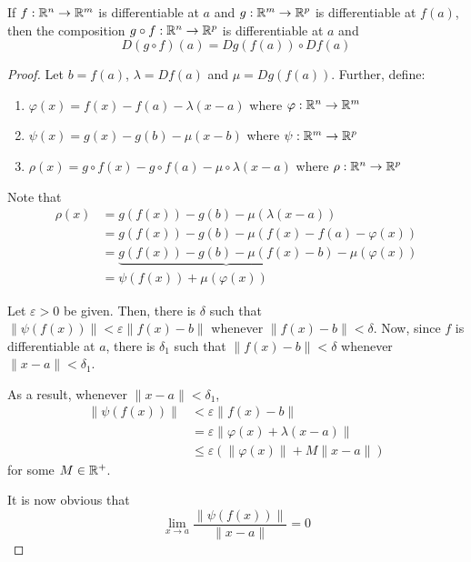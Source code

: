 \begin{theorem}
    If $f:\mathbb{R}^n\to\mathbb{R}^m$ is differentiable at $a$ and $g:\mathbb{R}^m\to\mathbb{R}^p$ is differentiable at $f(a)$, then the composition $g\circ f:\mathbb{R}^n\to\mathbb{R}^p$ is differentiable at $a$ and 
    \begin{equation*}
        D(g\circ f)(a) = Dg(f(a))\circ Df(a)
    \end{equation*}
\end{theorem}
\begin{proof}
    Let $b = f(a)$, $\lambda = Df(a)$ and $\mu = Dg(f(a))$. Further, define: 
    \begin{enumerate}
        \item $\varphi(x) = f(x) - f(a) - \lambda(x - a)$ where $\varphi:\mathbb{R}^n\to\mathbb{R}^m$
        \item $\psi(x) = g(x) - g(b) - \mu(x - b)$ where $\psi:\mathbb{R}^m\to\mathbb{R}^p$
        \item $\rho(x) = g\circ f(x) - g\circ f(a) - \mu\circ\lambda(x - a)$ where $\rho:\mathbb{R}^n\to\mathbb{R}^p$
    \end{enumerate}

    Note that 
    \begin{align*}
        \rho(x) &= g(f(x)) - g(b) - \mu(\lambda(x - a))\\
        &= g(f(x)) - g(b) - \mu(f(x) - f(a) - \varphi(x))\\
        &= \underbrace{g(f(x)) - g(b) - \mu(f(x) - b)} - \mu(\varphi(x))\\
        &= \psi(f(x)) + \mu(\varphi(x))
    \end{align*}

    Let $\varepsilon > 0$ be given. Then, there is $\delta$ such that $\|\psi(f(x))\| < \varepsilon\|f(x) - b\|$ whenever $\|f(x) - b\| < \delta$. Now, since $f$ is differentiable at $a$, there is $\delta_1$ such that $\|f(x) - b\| < \delta$ whenever $\|x - a\| < \delta_1$. 

    As a result, whenever $\|x - a\| < \delta_1$, 
    \begin{align*}
        \|\psi(f(x))\| &< \varepsilon\|f(x) - b\|\\
        &= \varepsilon\|\varphi(x) + \lambda(x - a)\|\\
        &\le \varepsilon\left(\|\varphi(x)\| + M\|x - a\|\right)
    \end{align*}
    for some $M\in\mathbb{R}^+$.

    It is now obvious that 
    \begin{equation*}
        \lim_{x\to a}\frac{\|\psi(f(x))\|}{\|x - a\|} = 0
    \end{equation*}


\end{proof}
